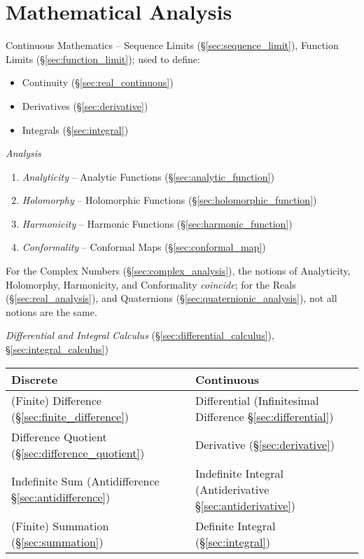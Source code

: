 \part{Mathematical Analysis}\label{part:mathematical_analysis}

Continuous Mathematics -- Sequence Limits (\S\ref{sec:sequence_limit}), Function
Limits (\S\ref{sec:function_limit}); used to define:
\begin{itemize}
  \item Continuity (\S\ref{sec:real_continuous})
  \item Derivatives (\S\ref{sec:derivative})
  \item Integrals (\S\ref{sec:integral})
\end{itemize}

\emph{Analysis}

\begin{enumerate}
  \item \emph{Analyticity} -- Analytic Functions (\S\ref{sec:analytic_function})
  \item \emph{Holomorphy} -- Holomorphic Functions
    (\S\ref{sec:holomorphic_function})
  \item \emph{Harmonicity} -- Harmonic Functions
    (\S\ref{sec:harmonic_function})
  \item \emph{Conformality} -- Conformal Maps (\S\ref{sec:conformal_map})
\end{enumerate}

For the Complex Numbers (\S\ref{sec:complex_analysis}), the notions of
Analyticity, Holomorphy, Harmonicity, and Conformality \emph{coincide}; for the
Reals (\S\ref{sec:real_analysis}), and Quaternions
(\S\ref{sec:quaternionic_analysis}), not all notions are the same.

\emph{Differential and Integral Calculus} (\S\ref{sec:differential_calculus}),
\S\ref{sec:integral_calculus})

\begin{tabular}{|l l|}
  \hline
  Discrete & Continuous \\
  \hline
  (Finite) Difference (\S\ref{sec:finite_difference}) &
    Differential (Infinitesimal Difference \S\ref{sec:differential}) \\
  Difference Quotient (\S\ref{sec:difference_quotient}) &
    Derivative (\S\ref{sec:derivative}) \\
  Indefinite Sum (Antidifference \S\ref{sec:antidifference}) &
    Indefinite Integral (Antiderivative \S\ref{sec:antiderivative}) \\
  (Finite) Summation (\S\ref{sec:summation}) &
    Definite Integral (\S\ref{sec:integral}) \\
  \hline
\end{tabular}

